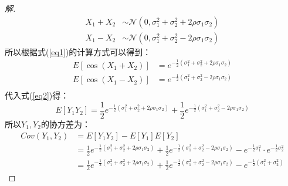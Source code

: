 \documentclass[12pt]{article}
\begin{document}
\begin{enumerate}
\begin{proof}[解]
\begin{equation}
	\begin{aligned}
	X_1+X_2 &\sim \mathcal{N}(0,\sigma_1^2+\sigma_2^2+2\rho\sigma_1\sigma_2) \\
	X_1-X_2 &\sim \mathcal{N}(0,\sigma_1^2+\sigma_2^2-2\rho\sigma_1\sigma_2)
	\end{aligned}
	\end{equation}
	所以根据式(\ref{eq1})的计算方式可以得到：
	\begin{equation}
	\begin{aligned}
	E\left[\cos(X_1+X_2)\right]&=e^{-\frac{1}{2}(\sigma_1^2+\sigma_2^2+2\rho\sigma_1\sigma_2)} \\
	E\left[\cos(X_1-X_2)\right]&=e^{-\frac{1}{2}(\sigma_1^2+\sigma_2^2-2\rho\sigma_1\sigma_2)} \\
	\end{aligned}
	\end{equation}
	代入式(\ref{eq2})得：
	\begin{equation}
	E[Y_1Y_2]=\frac{1}{2}e^{-\frac{1}{2}(\sigma_1^2+\sigma_2^2+2\rho\sigma_1\sigma_2)}+\frac{1}{2}e^{-\frac{1}{2}(\sigma_1^2+\sigma_2^2-2\rho\sigma_1\sigma_2)}
	\end{equation}
	所以$Y_1,Y_2$的协方差为：
	\begin{equation}
	\begin{aligned}
	Cov(Y_1,Y_2)&=E[Y_1Y_2]-E[Y_1]E[Y_2] \\
	&=\frac{1}{2}e^{-\frac{1}{2}(\sigma_1^2+\sigma_2^2+2\rho\sigma_1\sigma_2)}+\frac{1}{2}e^{-\frac{1}{2}(\sigma_1^2+\sigma_2^2-2\rho\sigma_1\sigma_2)}-e^{-\frac{1}{2}\sigma_1^2}\cdot e^{-\frac{1}{2}\sigma_2^2} \\
	&=\frac{1}{2}e^{-\frac{1}{2}(\sigma_1^2+\sigma_2^2+2\rho\sigma_1\sigma_2)}+\frac{1}{2}e^{-\frac{1}{2}(\sigma_1^2+\sigma_2^2-2\rho\sigma_1\sigma_2)}-e^{-\frac{1}{2}(\sigma_1^2+\sigma_2^2)}
	\end{aligned}
	\end{equation}
\end{proof}


\end{enumerate}
\end{document}
